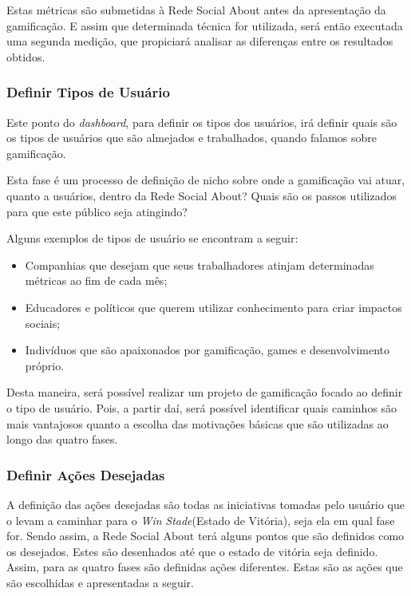 Estas métricas são submetidas à Rede Social About antes da apresentação da
gamificação. E assim que determinada técnica for utilizada, será então executada uma
segunda medição, que propiciará analisar as diferenças entre os resultados obtidos.

\subsubsection{Definir Tipos de Usuário}
\label{sub:define_user_types}
Este ponto do \textit{dashboard}, para definir os tipos dos usuários, irá
definir quais são os tipos de usuários que são almejados e trabalhados, quando
falamos sobre gamificação.

Esta fase é um processo de definição de nicho sobre onde a gamificação vai atuar, quanto a
usuários, dentro da Rede Social About? Quais são os passos utilizados para que este público
seja atingindo?

Alguns exemplos de tipos de usuário se encontram a seguir:

\begin{itemize}
    \item Companhias que desejam que seus trabalhadores atinjam determinadas métricas
        ao fim de cada mês;
    \item Educadores e políticos que querem utilizar conhecimento para criar impactos
        sociais;
    \item Indivíduos que são apaixonados por gamificação, games e desenvolvimento próprio.
\end{itemize}

Desta maneira, será possível realizar um projeto de gamificação focado ao definir o tipo
de usuário. Pois, a partir daí, será possível identificar quais caminhos são mais vantajosos
quanto a escolha das motivações básicas que são utilizadas ao longo das quatro fases.

\subsubsection{Definir Ações Desejadas}
\label{sub:define_desired_actions}
A definição das ações desejadas são todas as iniciativas tomadas pelo usuário que o 
levam a caminhar para
o \textit{Win} \textit{Stade}(Estado de Vitória), seja ela em qual fase for. Sendo assim, a Rede Social
About terá alguns pontos que são definidos como os desejados. Estes são desenhados
até que o estado de vitória seja definido. Assim, para as quatro fases são definidas
ações diferentes. Estas são as  ações que são escolhidas e apresentadas
a seguir.

